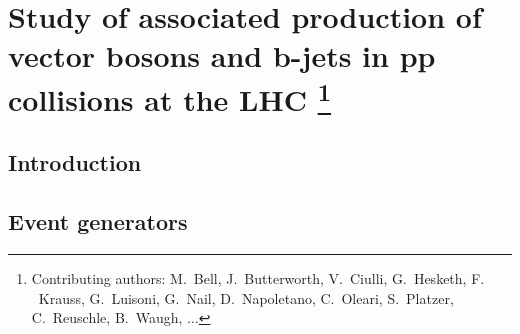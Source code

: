 \documentclass[11pt]{cernrep} \usepackage{graphicx,epsfig} 
\begin{document}
\section{Study of associated production of vector bosons and b-jets in
  pp collisions at the LHC \protect\footnote{Contributing authors:
    M.~Bell, J.~Butterworth,  V.~Ciulli,
    G.~Hesketh, F. ~Krauss, G.~Luisoni, G.~Nail, D.~Napoletano,
    C.~Oleari, S.~Platzer, C.~Reuschle, B.~Waugh, ... }}

\subsection{Introduction}

\subsection{Event generators}
\end{document}
